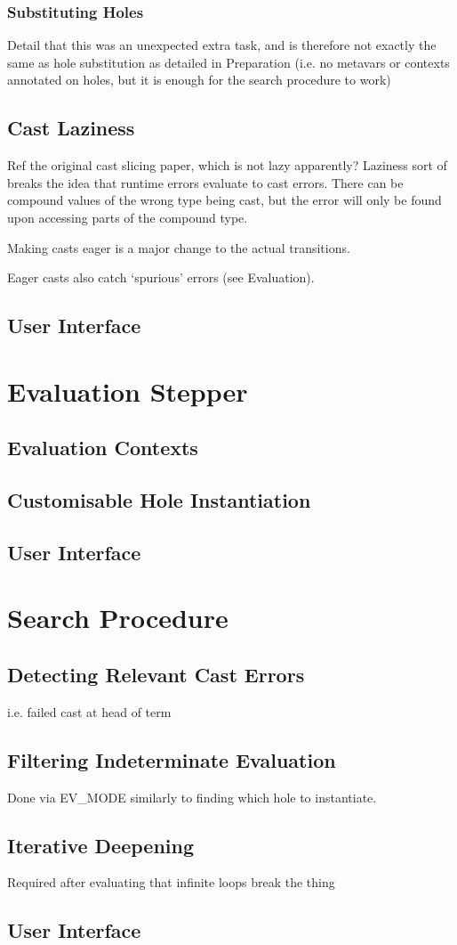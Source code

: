 \subsubsection{Substituting Holes}\label{sec:HoleSubstitutionImplementation}
Detail that this was an unexpected extra task, and is therefore not exactly the same as hole substitution as detailed in Preparation (i.e. no metavars or contexts annotated on holes, but it is enough for the search procedure to work)

\subsection{Cast Laziness}\label{sec:CastLaziness}
Ref the original cast slicing paper, which is not lazy apparently? Laziness sort of breaks the idea that runtime errors evaluate to cast errors. There can be compound values of the wrong type being cast, but the error will only be found upon accessing parts of the compound type.

Making casts eager is a major change to the actual transitions.

Eager casts also catch `spurious' errors (see Evaluation).


\subsection{User Interface}

\section{Evaluation Stepper}\label{sec:Stepper}
\subsection{Evaluation Contexts}
\subsection{Customisable Hole Instantiation}
\subsection{User Interface}


\section{Search Procedure}\label{sec:SearchProcedure}
\subsection{Detecting Relevant Cast Errors}
i.e. failed cast at head of term
\subsection{Filtering Indeterminate Evaluation}
Done via EV\_MODE similarly to finding which hole to instantiate.

\subsection{Iterative Deepening}\label{sec:IterativeDeepening}
Required after evaluating that infinite loops break the thing
\subsection{User Interface}


